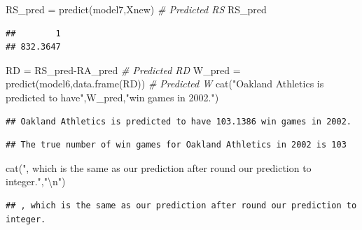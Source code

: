 \documentclass[
]{article}
\newenvironment{Shaded}{\begin{snugshade}}{\end{snugshade}}
\newcommand{\CommentTok}[1]{\textcolor[rgb]{0.56,0.35,0.01}{\textit{#1}}}
\newcommand{\DecValTok}[1]{\textcolor[rgb]{0.00,0.00,0.81}{#1}}
\newcommand{\FunctionTok}[1]{\textcolor[rgb]{0.00,0.00,0.00}{#1}}
\newcommand{\NormalTok}[1]{#1}
\newcommand{\OtherTok}[1]{\textcolor[rgb]{0.56,0.35,0.01}{#1}}
\newcommand{\SpecialCharTok}[1]{\textcolor[rgb]{0.00,0.00,0.00}{#1}}
\newcommand{\StringTok}[1]{\textcolor[rgb]{0.31,0.60,0.02}{#1}}
\begin{document}
\begin{Shaded}
\begin{Highlighting}[]
\NormalTok{RS\_pred }\OtherTok{=} \FunctionTok{predict}\NormalTok{(model7,Xnew) }\CommentTok{\# Predicted RS}
\NormalTok{RS\_pred}
\end{Highlighting}
\end{Shaded}

\begin{verbatim}
##        1 
## 832.3647
\end{verbatim}

\begin{Shaded}
\begin{Highlighting}[]
\NormalTok{RD }\OtherTok{=}\NormalTok{ RS\_pred}\SpecialCharTok{{-}}\NormalTok{RA\_pred }\CommentTok{\# Predicted RD}
\NormalTok{W\_pred }\OtherTok{=} \FunctionTok{predict}\NormalTok{(model6,}\FunctionTok{data.frame}\NormalTok{(RD)) }\CommentTok{\# Predicted W}
\FunctionTok{cat}\NormalTok{(}\StringTok{"Oakland Athletics is predicted to have"}\NormalTok{,W\_pred,}\StringTok{"win games in 2002."}\NormalTok{)}
\end{Highlighting}
\end{Shaded}

\begin{verbatim}
## Oakland Athletics is predicted to have 103.1386 win games in 2002.
\end{verbatim}

\begin{Shaded}
\end{Shaded}

\begin{verbatim}
## The true number of win games for Oakland Athletics in 2002 is 103
\end{verbatim}

\begin{Shaded}
\begin{Highlighting}[]
\FunctionTok{cat}\NormalTok{(}\StringTok{", which is the same as our prediction after round our prediction to integer."}\NormalTok{,}\StringTok{"}\SpecialCharTok{\textbackslash{}n}\StringTok{"}\NormalTok{)}
\end{Highlighting}
\end{Shaded}

\begin{verbatim}
## , which is the same as our prediction after round our prediction to integer.
\end{verbatim}
\end{document}
